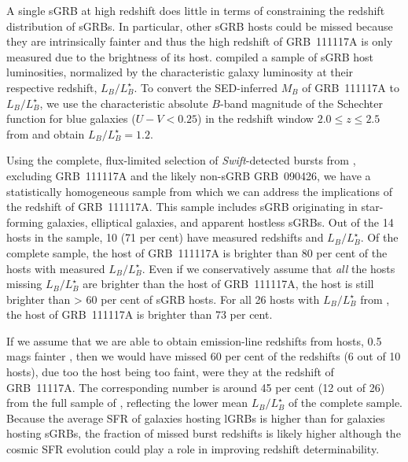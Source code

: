 \documentclass{aa}    %
\begin{document}
A single sGRB at high redshift does little in terms of constraining the redshift
distribution of sGRBs. In particular, other sGRB hosts could be missed because
they are intrinsically fainter and thus the high redshift of GRB~111117A is only
measured due to the brightness of its host. \citet{Berger2014} compiled a
sample of sGRB host luminosities, normalized by the characteristic galaxy
luminosity at their respective redshift, $L_B/L^{\star}_{B}$. To convert the
SED-inferred $M_B$ of GRB~111117A to $L_B/L^{\star}_{B}$, we use the
characteristic absolute $B$-band magnitude of the Schechter function for blue
galaxies ($U - V < 0.25$) in the redshift window $2.0 \leq z \leq 2.5$ from
\citet{Marchesini2007} and obtain $L_B/L^{\star}_{B} = 1.2$.

Using the complete, flux-limited selection of \textit{Swift}-detected bursts
from \citet{DAvanzo2014a}, excluding GRB~111117A and the likely non-sGRB
GRB~090426, we have a statistically homogeneous sample from which we can address
the implications of the redshift of GRB~111117A. This sample includes sGRB
originating in star-forming galaxies, elliptical galaxies, and apparent hostless
sGRBs. Out of the 14 hosts in the sample, 10 (71 per cent) have measured
redshifts and $L_B/L^{\star}_{B}$. Of the complete sample, the host of
GRB~111117A  is brighter than 80 per cent of the hosts with measured
$L_B/L^{\star}_{B}$. Even if we conservatively assume that \textit{all} the
hosts missing $L_B/L^{\star}_{B}$ are brighter than the host of GRB~111117A, the
host is still brighter than > 60 per cent of sGRB hosts. For all 26 hosts with
$L_B/L^{\star}_{B}$ from \citet{Berger2014}, the host of GRB~111117A is brighter
than 73 per cent.

If we assume that we are able to obtain emission-line redshifts from hosts, 0.5
mags fainter \citep[$R < 24.5$~mag;][]{Kruhler2012}, then we would have missed
60 per cent of the redshifts (6 out of 10 hosts), due too the host being too
faint, were they at the redshift of GRB~11117A. The corresponding number is
around 45 per cent (12 out of 26) from the full sample of \citet{Berger2014},
reflecting the lower mean $L_B/L^{\star}_{B}$ of the complete sample. Because
the average SFR of galaxies hosting lGRBs is higher than for galaxies hosting
sGRBs, the fraction of missed burst redshifts is likely higher although the
cosmic SFR evolution could play a role in improving redshift determinability.
\end{document}
